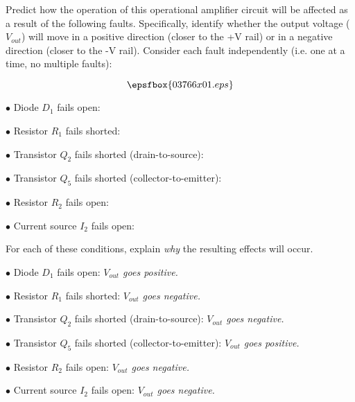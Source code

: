 

Predict how the operation of this operational amplifier circuit will be affected as a result of the following faults.  Specifically, identify whether the output voltage ($V_{out}$) will move in a positive direction (closer to the +V rail) or in a negative direction (closer to the -V rail).  Consider each fault independently (i.e. one at a time, no multiple faults):

$$\epsfbox{03766x01.eps}$$

\medskip
\item{$\bullet$} Diode $D_1$ fails open:
\vskip 5pt
\item{$\bullet$} Resistor $R_1$ fails shorted:
\vskip 5pt
\item{$\bullet$} Transistor $Q_2$ fails shorted (drain-to-source):
\vskip 5pt
\item{$\bullet$} Transistor $Q_5$ fails shorted (collector-to-emitter):
\vskip 5pt
\item{$\bullet$} Resistor $R_2$ fails open:
\vskip 5pt
\item{$\bullet$} Current source $I_2$ fails open:
\medskip

For each of these conditions, explain {\it why} the resulting effects will occur.







\medskip
\item{$\bullet$} Diode $D_1$ fails open: {\it $V_{out}$ goes positive.}
\vskip 5pt
\item{$\bullet$} Resistor $R_1$ fails shorted: {\it $V_{out}$ goes negative.}
\vskip 5pt
\item{$\bullet$} Transistor $Q_2$ fails shorted (drain-to-source): {\it $V_{out}$ goes negative.}
\vskip 5pt
\item{$\bullet$} Transistor $Q_5$ fails shorted (collector-to-emitter): {\it $V_{out}$ goes positive.}
\vskip 5pt
\item{$\bullet$} Resistor $R_2$ fails open: {\it $V_{out}$ goes negative.}
\vskip 5pt
\item{$\bullet$} Current source $I_2$ fails open: {\it $V_{out}$ goes negative.}
\medskip


